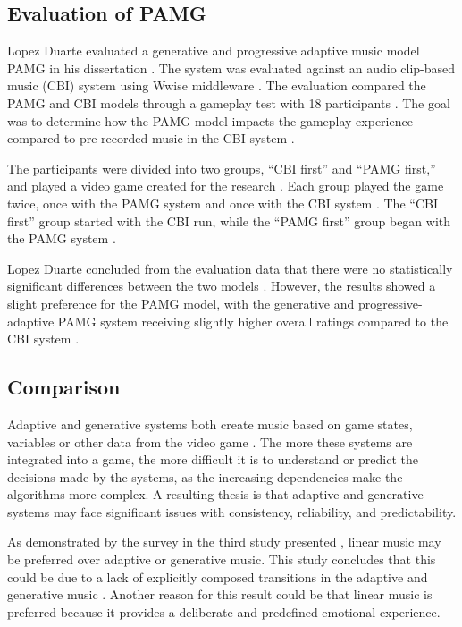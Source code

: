 \subsection{Evaluation of PAMG}
Lopez Duarte evaluated a generative and progressive adaptive music model PAMG in his dissertation \cite{lopez2023progressive}. The system was evaluated against an audio clip-based music (CBI) system using Wwise \cite{wwise} middleware \cite{lopez2023progressive}. The evaluation compared the PAMG and CBI models through a gameplay test with 18 participants \cite{lopez2023progressive}. The goal was to determine how the PAMG model impacts the gameplay experience compared to pre-recorded music in the CBI system \cite{lopez2023progressive}.

The participants were divided into two groups, “CBI first” and “PAMG first,” and played a video game created for the research \cite{lopez2023progressive}. Each group played the game twice, once with the PAMG system and once with the CBI system \cite{lopez2023progressive}. The “CBI first” group started with the CBI run, while the “PAMG first” group began with the PAMG system \cite{lopez2023progressive}.

Lopez Duarte concluded from the evaluation data that there were no statistically significant differences between the two models \cite{lopez2023progressive}. However, the results showed a slight preference for the PAMG model, with the generative and progressive-adaptive PAMG system receiving slightly higher overall ratings compared to the CBI system \cite{lopez2023progressive}.


\subsection{Comparison}
Adaptive and generative systems both create music based on game states, variables or other data from the video game \cite{plut2020generative} \cite{plut2022preglam}. The more these systems are integrated into a game, the more difficult it is to understand or predict the decisions made by the systems, as the increasing dependencies make the algorithms more complex. A resulting thesis is that adaptive and generative systems may face significant issues with consistency, reliability, and predictability.

As demonstrated by the survey in the third study presented \cite{plut2022preglam}, linear music may be preferred over adaptive or generative music. This study concludes that this could be due to a lack of explicitly composed transitions in the adaptive and generative music \cite{plut2022preglam}. Another reason for this result could be that linear music is preferred because it provides a deliberate and predefined emotional experience.

